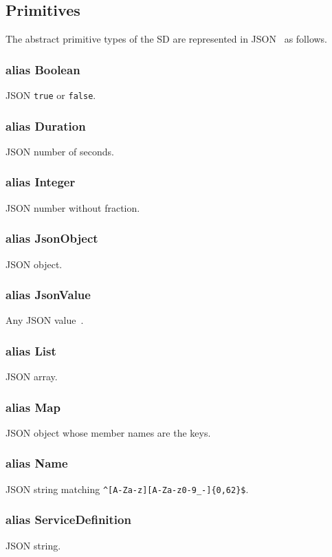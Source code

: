 \documentclass[a4paper]{arrowhead}
\newcommand{\pdef}[1]{{\textcolor{ArrowheadGrey}{#1\label{sec:model:primitives:#1}\label{sec:model:primitives:#1s}}}}
\begin{document}
\subsection{Primitives}
\label{sec:model:primitives}
The abstract primitive types of the SD are represented in JSON~\cite{rfc8259} as follows.
\subsubsection*{alias \pdef{Boolean}}
JSON \texttt{true} or \texttt{false}.

\subsubsection*{alias \pdef{Duration}}
JSON number of seconds.

\subsubsection*{alias \pdef{Integer}}
JSON number without fraction.

\subsubsection*{alias \pdef{JsonObject}}
JSON object.

\subsubsection*{alias \pdef{JsonValue}}
Any JSON value~\cite{rfc8259}.

\subsubsection*{alias \pdef{List}}
JSON array.

\subsubsection*{alias \pdef{Map}}
JSON object whose member names are the keys.

\subsubsection*{alias \pdef{Name}}
JSON string matching \texttt{\^{}[A-Za-z][A-Za-z0-9\_-]\{0,62\}\$}.

\subsubsection*{alias \pdef{ServiceDefinition}}
JSON string.
\end{document}
